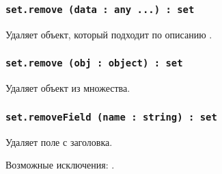 \subsubsection{\lstinline|set.remove (data : any ...) : set|}

Удаляет объект, который подходит по описанию .

\subsubsection{\lstinline|set.remove (obj : object) : set|}

Удаляет объект  из множества.

\subsubsection{\lstinline|set.removeField (name : string) : set|}

Удаляет поле  с заголовка.

Возможные исключения: .

